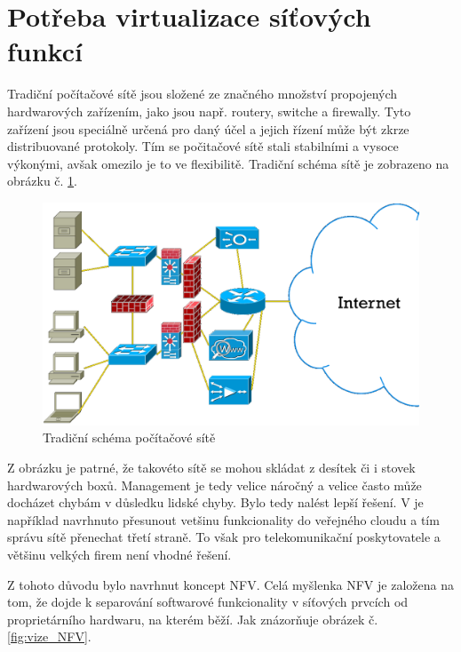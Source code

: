 \section{Potřeba virtualizace síťových funkcí}

Tradiční počítačové sítě jsou složené ze značného množství propojených hardwarových zařízením, jako jsou např. routery, switche a firewally. Tyto zařízení jsou speciálně určená pro daný účel a jejich řízení může být zkrze distribuované protokoly. Tím se počitačové sítě stali stabilními a vysoce výkonými, avšak omezilo je to ve flexibilitě. Tradiční schéma sítě je zobrazeno na obrázku č. \ref{fig:network}.

\begin{figure}[h]
\begin{centering}
\includegraphics[scale=0.30]{images/network}
\par\end{centering}
\caption{Tradiční schéma počítačové sítě} \label{fig:network}
\end{figure}

Z obrázku je patrné, že takovéto sítě se mohou skládat z desítek či i stovek hardwarových boxů. Management je tedy velice náročný a velice často může docházet chybám v důsledku lidské chyby. Bylo tedy nalést lepší řešení. V \cite{Middleboxes} je například navrhnuto přesunout vetšinu funkcionality do veřejného cloudu a tím správu sítě přenechat třetí straně. To však pro telekomunikační poskytovatele a většinu velkých firem není vhodné řešení. 

Z tohoto důvodu bylo navrhnut koncept NFV. Celá myšlenka NFV je založena na tom, že dojde k separování softwarové funkcionality v síťových prvcích od proprietárního hardwaru, na kterém běží. Jak znázorňuje obrázek č. \ref{fig:vize_NFV}. 

